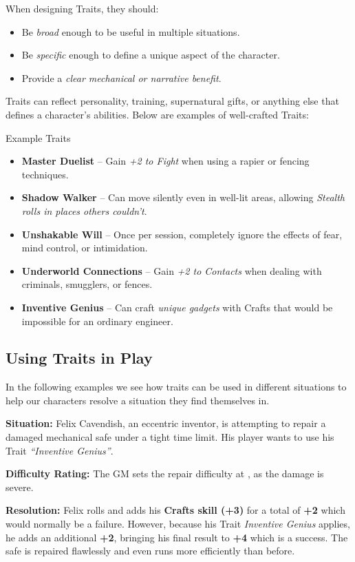 When designing Traits, they should:
\begin{itemize}
    \item Be \emph{broad} enough to be useful in multiple situations.
    \item Be \emph{specific} enough to define a unique aspect of the character.
    \item Provide a \emph{clear mechanical or narrative benefit}.
\end{itemize}

Traits can reflect personality, training, supernatural gifts, or anything else that defines a character’s abilities. Below are examples of well-crafted Traits:

\begin{WyrdExampleSidebar}[float=!t]{Example Traits}
    \begin{itemize}
        \item \textbf{Master Duelist} – Gain \emph{+2 to Fight} when using a rapier or fencing techniques.
        \item \textbf{Shadow Walker} – Can move silently even in well-lit areas, allowing \emph{Stealth rolls in places others couldn’t}.
        \item \textbf{Unshakable Will} – Once per session, completely ignore the effects of fear, mind control, or intimidation.
        \item \textbf{Underworld Connections} – Gain \emph{+2 to Contacts} when dealing with criminals, smugglers, or fences.
        \item \textbf{Inventive Genius} – Can craft \emph{unique gadgets} with Crafts that would be impossible for an ordinary engineer.
    \end{itemize}
\end{WyrdExampleSidebar}

\subsection{Using Traits in Play}

In the following examples we see how traits can be used in different situations to help our characters resolve a situation they find themselves in.



\begin{WyrdExample}
	\textbf{Situation:} Felix Cavendish, an eccentric inventor, is attempting to repair a damaged mechanical safe under a tight time limit. His player wants to use his Trait \emph{“Inventive Genius”}.

	\noindent\textbf{Difficulty Rating:} The GM sets the repair difficulty at \Arduous, as the damage is severe.

    \noindent\textbf{Resolution:} Felix rolls  and adds his \textbf{Crafts skill (+3)} for a total of \textbf{+2} which would normally be a failure. However, because his Trait \emph{Inventive Genius} applies, he adds an additional \textbf{+2}, bringing his final result to \textbf{+4} which is a success. The safe is repaired flawlessly and even runs more efficiently than before.
\end{WyrdExample}

